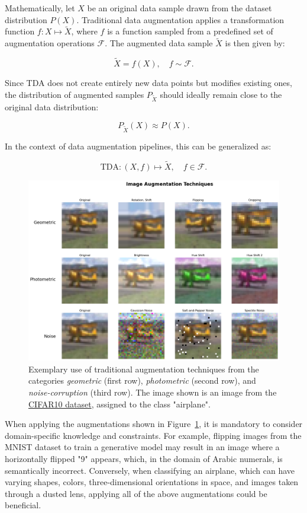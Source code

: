 Mathematically, let \( X \) be an original data sample drawn from the dataset distribution \( P(X) \). Traditional data augmentation applies a transformation function \( f: X \mapsto \tilde{X} \), where \( f \) is a function sampled from a predefined set of augmentation operations \( \mathcal{F} \). The augmented data sample \( \tilde{X} \) is then given by:

\[
\tilde{X} = f(X), \quad f \sim \mathcal{F}.
\]

Since TDA does not create entirely new data points but modifies existing ones, the distribution of augmented samples \( P_{\tilde{X}} \) should ideally remain close to the original data distribution:

\[
P_{\tilde{X}}(X) \approx P(X).
\]

In the context of data augmentation pipelines, this can be generalized as:

\[
\text{TDA}: (X, f) \mapsto \tilde{X}, \quad f \in \mathcal{F}.
\]

\begin{figure}[htbp]
    \centering
    \includegraphics[width=.9\textwidth]{abb/traditional_image_augmentation_examples.png}
    \caption{Exemplary use of traditional augmentation techniques from the categories \textit{geometric} (first row), \textit{photometric} (second row), and \textit{noise-corruption} (third row). The image shown is an image from the \hyperref[used_datasets]{CIFAR10 dataset}, assigned to the class "airplane".}
    \label{fig:figure_tda_examples}
\end{figure}

\noindent
When applying the augmentations shown in Figure~\ref{fig:figure_tda_examples}, it is mandatory to consider domain-specific knowledge and constraints. For example, flipping images from the MNIST dataset to train a generative model may result in an image where a horizontally flipped "9" appears, which, in the domain of Arabic numerals, is semantically incorrect. Conversely, when classifying an airplane, which can have varying shapes, colors, three-dimensional orientations in space, and images taken through a dusted lens, applying all of the above augmentations could be beneficial.


